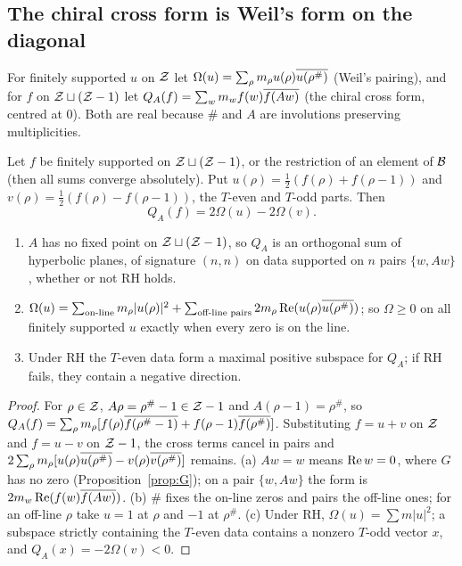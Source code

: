 \subsection{The chiral cross form is Weil's form on the diagonal}

For finitely supported $u$ on $\mathcal{Z}$ let $\Omega(u)=\sum_\rho m_\rho u(\rho)\overline{u(\rho^\#)}$ (Weil's pairing), and for $f$ on $\mathcal{Z}\sqcup(\mathcal{Z}-1)$ let $Q_A(f)=\sum_wm_wf(w)\overline{f(Aw)}$ (the chiral cross form, centred at $0$). Both are real because $\#$ and $A$ are involutions preserving multiplicities.

\begin{proposition}\label{prop:chiral}
Let $f$ be finitely supported on $\mathcal{Z}\sqcup(\mathcal{Z}-1)$, or the restriction of an element of $\mathcal{B}$ (then all sums converge absolutely). Put $u(\rho)=\tfrac12(f(\rho)+f(\rho-1))$ and $v(\rho)=\tfrac12(f(\rho)-f(\rho-1))$, the $T$-even and $T$-odd parts. Then
\[
Q_A(f)=2\Omega(u)-2\Omega(v).
\]
\begin{enumerate}[label=(\alph*)]
\item $A$ has no fixed point on $\mathcal{Z}\sqcup(\mathcal{Z}-1)$, so $Q_A$ is an orthogonal sum of hyperbolic planes, of signature $(n,n)$ on data supported on $n$ pairs $\{w,Aw\}$, whether or not RH holds.
\item $\Omega(u)=\sum_{\text{on-line}}m_\rho|u(\rho)|^2+\sum_{\text{off-line pairs}}2m_\rho\operatorname{Re}(u(\rho)\overline{u(\rho^\#)})$; so $\Omega\ge0$ on all finitely supported $u$ exactly when every zero is on the line.
\item Under RH the $T$-even data form a maximal positive subspace for $Q_A$; if RH fails, they contain a negative direction.
\end{enumerate}
\end{proposition}

\begin{proof}
For $\rho\in\mathcal{Z}$, $A\rho=\rho^\#-1\in\mathcal{Z}-1$ and $A(\rho-1)=\rho^\#$, so $Q_A(f)=\sum_\rho m_\rho[f(\rho)\overline{f(\rho^\#-1)}+f(\rho-1)\overline{f(\rho^\#)}]$. Substituting $f=u+v$ on $\mathcal{Z}$ and $f=u-v$ on $\mathcal{Z}-1$, the cross terms cancel in pairs and $2\sum_\rho m_\rho[u(\rho)\overline{u(\rho^\#)}-v(\rho)\overline{v(\rho^\#)}]$ remains.
(a) $Aw=w$ means $\operatorname{Re} w=0$, where $G$ has no zero (Proposition~\ref{prop:G}); on a pair $\{w,Aw\}$ the form is $2m_w\operatorname{Re}(f(w)\overline{f(Aw)})$.
(b) $\#$ fixes the on-line zeros and pairs the off-line ones; for an off-line $\rho$ take $u=1$ at $\rho$ and $-1$ at $\rho^\#$.
(c) Under RH, $\Omega(u)=\sum m|u|^2$; a subspace strictly containing the $T$-even data contains a nonzero $T$-odd vector $x$, and $Q_A(x)=-2\Omega(v)<0$.
\end{proof}

